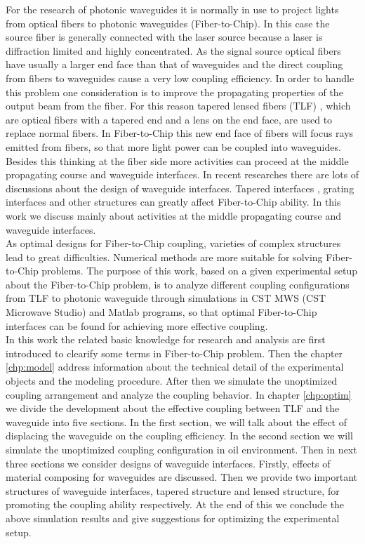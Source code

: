 For the research of photonic waveguides it is normally in use to project lights from optical fibers to photonic waveguides (Fiber-to-Chip). In this case the source fiber is generally connected with the laser source because a laser is diffraction limited and highly concentrated. As the signal source optical fibers have usually a larger end face than that of waveguides and the direct coupling from fibers to waveguides cause a very low coupling efficiency. In order to handle this problem one consideration is to improve the propagating properties of the output beam from the fiber. For this reason tapered lensed fibers (TLF) \cite{TLF_mode_transforming,TLF_analysis}, which are optical fibers with a tapered end and a lens on the end face, are used to replace normal fibers. In Fiber-to-Chip this new end face of fibers will focus rays emitted from fibers, so that more light power can be coupled into waveguides. Besides this thinking at the fiber side more activities can proceed at the middle propagating course and waveguide interfaces. In recent researches there are lots of discussions about the design of waveguide interfaces. Tapered interfaces \cite{design_fabrication_tapered_waveguide}, grating interfaces \cite{fiber_to_chip_grating_waveguides} and other structures can greatly affect Fiber-to-Chip ability. In this work we discuss mainly about activities at the middle propagating course and waveguide interfaces.\\ 

As optimal designs for Fiber-to-Chip coupling, varieties of complex structures lead to great difficulties. Numerical methods are more suitable for solving Fiber-to-Chip problems. The purpose of this work, based on a given experimental setup about the Fiber-to-Chip problem, is to analyze different coupling configurations from TLF to photonic waveguide through simulations in CST MWS (CST Microwave Studio\textregistered) and Matlab programs, so that optimal Fiber-to-Chip interfaces can be found for achieving more effective coupling.\\

In this work the related basic knowledge for research and analysis are first introduced to clearify some terms in Fiber-to-Chip problem. Then the chapter \ref{chp:model} address information about the technical detail of the experimental objects and the modeling procedure. After then we simulate the unoptimized coupling arrangement and analyze the coupling behavior. In chapter \ref{chp:optim} we divide the development about the effective coupling between TLF and the waveguide into five sections. In the first section, we will talk about the effect of displacing the waveguide on the coupling efficiency. In the second section we will simulate the unoptimized coupling configuration in oil environment. Then in next three sections we consider designs of waveguide interfaces. Firstly, effects of material composing for waveguides are discussed. Then we provide two important structures of waveguide interfaces, tapered structure and lensed structure, for promoting the coupling ability respectively. At the end of this we conclude the above simulation results and give suggestions for optimizing the experimental setup.\\ 
